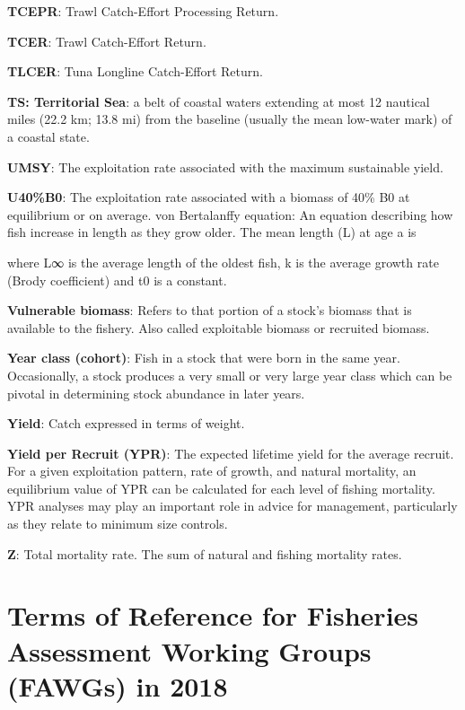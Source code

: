 \documentclass{mpi-plenary}
\theoremstyle{definition}
\theoremstyle{definition}
\theoremstyle{definition}
\theoremstyle{remark}
\begin{document}
\protect\hypertarget{def-tcepr}{}{} \textbf{TCEPR}: Trawl Catch-Effort
Processing Return.

\protect\hypertarget{def-tcer}{}{} \textbf{TCER}: Trawl Catch-Effort
Return.

\protect\hypertarget{def-tlcer}{}{} \textbf{TLCER}: Tuna Longline
Catch-Effort Return.

\protect\hypertarget{def-ts:-territorial-sea}{}{} \textbf{TS:
Territorial Sea}: a belt of coastal waters extending at most 12 nautical
miles (22.2 km; 13.8 mi) from the baseline (usually the mean low-water
mark) of a coastal state.

\protect\hypertarget{def-umsy}{}{} \textbf{UMSY}: The exploitation rate
associated with the maximum sustainable yield.

\protect\hypertarget{def-u40b0}{}{} \textbf{U40\%B0}: The exploitation
rate associated with a biomass of 40\% B0 at equilibrium or on average.
von Bertalanffy equation: An equation describing how fish increase in
length as they grow older. The mean length (L) at age a is

where L∞ is the average length of the oldest fish, k is the average
growth rate (Brody coefficient) and t0 is a constant.

\protect\hypertarget{def-vulnerable-biomass}{}{} \textbf{Vulnerable
biomass}: Refers to that portion of a stock's biomass that is available
to the fishery. Also called exploitable biomass or recruited biomass.

\protect\hypertarget{def-year-class-cohort}{}{} \textbf{Year class
(cohort)}: Fish in a stock that were born in the same year.
Occasionally, a stock produces a very small or very large year class
which can be pivotal in determining stock abundance in later years.

\protect\hypertarget{def-yield}{}{} \textbf{Yield}: Catch expressed in
terms of weight.

\protect\hypertarget{def-yield-per-recruit-ypr}{}{} \textbf{Yield per
Recruit (YPR)}: The expected lifetime yield for the average recruit. For
a given exploitation pattern, rate of growth, and natural mortality, an
equilibrium value of YPR can be calculated for each level of fishing
mortality. YPR analyses may play an important role in advice for
management, particularly as they relate to minimum size controls.

\protect\hypertarget{def-z}{}{} \textbf{Z}: Total mortality rate. The
sum of natural and fishing mortality rates.

\section{Terms of Reference for Fisheries Assessment Working Groups
(FAWGs) in
2018}\label{terms-of-reference-for-fisheries-assessment-working-groups-fawgs-in-2018}
\end{document}
